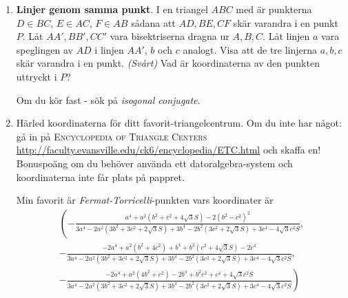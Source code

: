 \begin{enumerate}
\item \textbf{Linjer genom samma punkt}. 
    I en triangel $ABC$ med är punkterna $D \in BC$, $E \in AC$, $F \in AB$ sådana att
    $AD, BE, CF$ skär varandra i en punkt $P$. Låt $AA', BB', CC'$ vara bisektriserna 
    dragna ur $A, B, C$. Låt linjen $a$ vara speglingen av $AD$ i linjen $AA'$, $b$ och $c$ analogt.
    Visa att de tre linjerna $a,b,c$ skär varandra i en punkt. \textit{(Svårt)} Vad är koordinaterna av den
    punkten uttryckt i $P$? 

    {\tiny{Om du kör fast - sök på \textit{isogonal conjugate}}}.

\item Härled koordinaterna för ditt favorit-triangelcentrum. Om du inte har något: 
    gå in på \textsc{Encyclopedia of Triangle Centers} \url{http://faculty.evansville.edu/ck6/encyclopedia/ETC.html}
    och skaffa en! Bonuspoäng om du behöver använda ett datoralgebra-system och koordinaterna inte får
    plats på pappret.
        
        Min favorit är \textit{Fermat-Torricelli}-punkten vars koordinater är 
        \begin{eqnarray*}
        \left(-\frac{a^4+a^2 \left(b^2+c^2+4 \sqrt{3} S\right)-2 \left(b^2-c^2\right)^2}{3 a^4-2 a^2 \left(3 b^2+3 c^2+2 \sqrt{3} S\right)+3 b^4-2 b^2 \left(3 c^2+2 \sqrt{3} S\right)+3 c^4-4 \sqrt{3} c^2 S},\right.\\
        -\frac{-2 a^4+a^2 \left(b^2+4 c^2\right)+b^4+b^2 \left(c^2+4 \sqrt{3} S\right)-2 c^4}{3 a^4-2 a^2 \left(3 b^2+3 c^2+2 \sqrt{3} S\right)+3 b^4-2 b^2 \left(3 c^2+2 \sqrt{3} S\right)+3 c^4-4 \sqrt{3} c^2 S},\\
        \left.-\frac{-2 a^4+a^2 \left(4 b^2+c^2\right)-2 b^4+b^2 c^2+c^4+4 \sqrt{3} c^2 S}{3 a^4-2 a^2 \left(3 b^2+3 c^2+2 \sqrt{3} S\right)+3 b^4-2 b^2 \left(3 c^2+2 \sqrt{3} S\right)+3 c^4-4 \sqrt{3} c^2 S}\right)
        \end{eqnarray*}

\end{enumerate}

